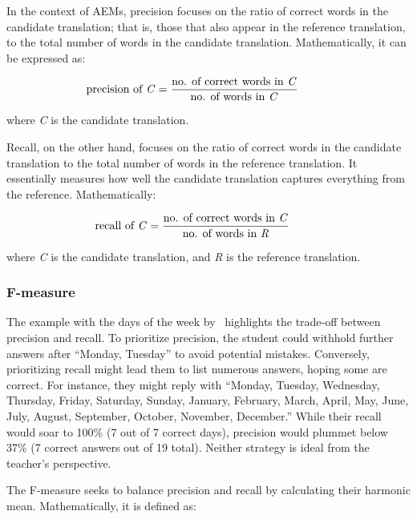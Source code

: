 {{In the context of AEMs, precision focuses on the ratio of correct words in the candidate translation; that is, those that also appear in the reference translation, to the total number of words in the candidate translation. Mathematically, it can be expressed as:

\begin{equation}    
 \text{precision of \emph{C}} = \frac{\text{no. of correct words in \emph{C}}}{\text{no. of words in \emph{C}}} \hspace{1cm}
\end{equation}

where \emph{C} is the candidate translation.

Recall, on the other hand, focuses on the ratio of correct words in the candidate translation to the total number of words in the reference translation. It essentially measures how well the candidate translation captures everything from the reference. Mathematically:

\begin{equation}    
 \text{recall of \emph{C}} = \frac{\text{no. of correct words in \emph{C}}}{\text{no. of words in \emph{R}}} \hspace{1cm}
\end{equation}

where \emph{C} is the candidate translation, and \emph{R} is the reference translation.

\subsubsection{F-measure}

The example with the days of the week by~\textcite{Rossi2022} highlights the trade-off between precision and recall. To prioritize precision, the student could withhold further answers after ``Monday, Tuesday'' to avoid potential mistakes. Conversely, prioritizing recall might lead them to list numerous answers, hoping some are correct. For instance, they might reply with ``Monday, Tuesday, Wednesday, Thursday, Friday, Saturday, Sunday, January, February, March, April, May, June, July, August, September, October, November, December.'' While their recall would soar to 100\% (7 out of 7 correct days), precision would plummet below 37\% (7 correct answers out of 19 total). Neither strategy is ideal from the teacher's perspective.

The F-measure seeks to balance precision and recall by calculating their harmonic mean. Mathematically, it is defined as:

}}
